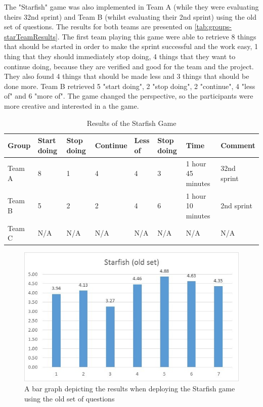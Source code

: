 The "Starfish" game was also implemented in Team A (while they were evaluating theirs 32nd sprint) and Team B (whilst evaluating their 2nd sprint) using the old set of questions. The results for both teams are presented on \autoref{tab:groups-starTeamResults}. The first team playing this game were able to retrieve 8 things that should be started in order to make the sprint successful and the work easy, 1 thing that they should immediately stop doing, 4 things that they want to continue doing, because they are verified and good for the team and the project. They also found 4 things that should be made less and 3 things that should be done more. Team B retrieved 5 "start doing", 2 "stop doing", 2 "continue", 4 "less of" and 6 "more of". The game changed the perspective, so the participants were more creative and interested in a the game.

\begin{table}[!htbp]
	\caption{Results of the Starfish Game}
	\label{tab:groups-starTeamResults}
	\begin{tabularx}{\textwidth}{|X|X|X|X|X|X|X|X|}
	\hline
		Group & Start doing & Stop doing & Continue & Less of &  Stop doing & Time & Comment\\ \hline
		Team A & 8 & 1 & 4 & 4 & 3 & 1 hour 45 minutes & 32nd sprint \\ \hline
		Team B & 5 & 2 & 2 & 4 & 6 & 1 hour 10 minutes & 2nd sprint \\ \hline
        Team C & N/A & N/A & N/A & N/A & N/A & N/A & N/A\\ \hline
	\end{tabularx}
\end{table}

\begin{figure}[!htbp]
\caption{A bar graph depicting the results when deploying the Starfish game using the old set of questions}
\label{fig:starfishResultsOld}
\centering
\includegraphics[width=1\textwidth]{charts/starfishOldSet}
\end{figure}

